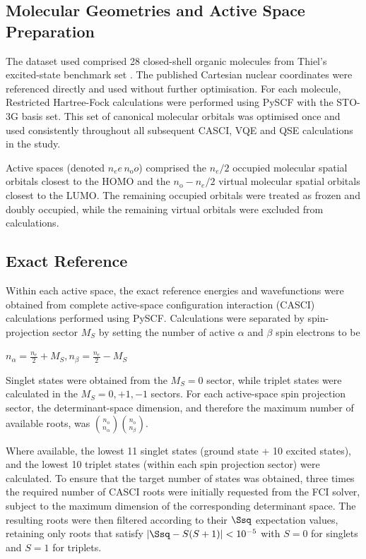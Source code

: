 \subsection{Molecular Geometries and Active Space Preparation}
The dataset used comprised 28 closed-shell organic molecules from Thiel's excited-state benchmark set \cite{thiels2008benchmark}. The published Cartesian nuclear coordinates were referenced directly and used without further optimisation. 
For each molecule, Restricted Hartree-Fock calculations were performed using PySCF \cite{pyscf2018,pyscf2020} with the STO-3G basis set. This set of canonical molecular orbitals was optimised once and used consistently throughout all subsequent CASCI, VQE and QSE calculations in the study. 

Active spaces (denoted $n_e e\, n_{\mathrm{o}} o$) comprised the $n_e / 2$ occupied molecular spatial orbitals closest to the HOMO and the $n_{\mathrm{o}} - n_e / 2$ virtual molecular spatial orbitals closest to the LUMO. The remaining occupied orbitals were treated as frozen and doubly occupied, while the remaining virtual orbitals were excluded from calculations. 

\subsection{Exact Reference}
Within each active space, the exact reference energies and wavefunctions were obtained from complete active-space configuration interaction (CASCI) calculations performed using PySCF. 
Calculations were separated by spin-projection sector $M_S$ by setting the number of active $\alpha$ and $\beta$ spin electrons to be 

$n_\alpha = \frac{n_e}{2} + M_S, n_\beta = \frac{n_e}{2} - M_S$

Singlet states were obtained from the $M_S=0$ sector, while triplet states were calculated in the $M_S=0, +1, -1$ sectors. For each active-space spin projection sector, the determinant-space dimension, and therefore the maximum number of available roots, was $\binom{n_{\mathrm{o}}}{n_\alpha} \binom{n_{\mathrm{o}}}{n_\beta}$. 

Where available, the lowest 11 singlet states (ground state + 10 excited states), and the lowest 10 triplet states (within each spin projection sector) were calculated. To ensure that the target number of states was obtained, three times the required number of CASCI roots were initially requested from the FCI solver, subject to the maximum dimension of the corresponding determinant space. 
The resulting roots were then filtered according to their $\Ssq$ expectation values, retaining only roots that satisfy $\left| \Ssq - S(S+1) \right| < 10^{-5}$ with $S=0$ for singlets and $S=1$ for triplets. 

